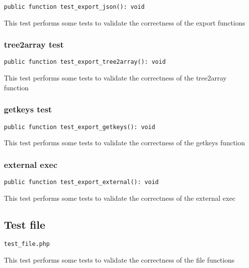 \documentclass[a4paper]{article}
\begin{document}
\begin{lstlisting}
public function test_export_json(): void
\end{lstlisting}

This test performs some tests to validate the correctness
of the export functions

\hypertarget{toc166}{}
\subsubsection{tree2array test}

\begin{lstlisting}
public function test_export_tree2array(): void
\end{lstlisting}

This test performs some tests to validate the correctness
of the tree2array function

\hypertarget{toc167}{}
\subsubsection{getkeys test}

\begin{lstlisting}
public function test_export_getkeys(): void
\end{lstlisting}

This test performs some tests to validate the correctness
of the getkeys function

\hypertarget{toc168}{}
\subsubsection{external exec}

\begin{lstlisting}
public function test_export_external(): void
\end{lstlisting}

This test performs some tests to validate the correctness
of the external exec

\hypertarget{toc169}{}
\subsection{Test file}

\begin{lstlisting}
test_file.php
\end{lstlisting}

This test performs some tests to validate the correctness
of the file functions

\hypertarget{toc170}{}
\end{document}
